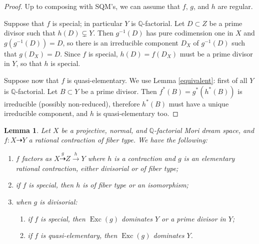 \documentclass[a4paper,12pt]{amsart}
\newtheorem{lemma}[thm]{Lemma}
\theoremstyle{definition}
\numberwithin{figure}{section}
\numberwithin{table}{section}
\newcommand{\Q}{\mathbb{Q}}
\newcommand{\Exc}{\operatorname{Exc}}
\begin{document}
\begin{proof}
Up to composing with SQM's, we can assume that $f$, $g$, and $h$ are regular.
  
Suppose that $f$ is special; in particular $Y$ is $\Q$-factorial. Let $D\subset Z$ be a prime divisor such that $h(D)\subsetneq Y$.
Then $g^{-1}(D)$ has pure codimension one in $X$ and $g(g^{-1}(D))=D$, so there is an irreducible component 
 $D_X$ of $g^{-1}(D)$ such that $g(D_X)=D$. Since $f$ is special, $h(D)=f(D_X)$ must be a prime divisor in $Y$, so that $h$ is special.

Suppose now that $f$ is quasi-elementary. We use Lemma \ref{equivalent}:
first of all $Y$ is $\Q$-factorial. Let $B\subset Y$ be a prime divisor. Then $f^*(B)=g^*(h^*(B))$ is irreducible (possibly non-reduced), therefore $h^*(B)$ must have a unique irreducible component, and $h$ is quasi-elementary too.
\end{proof}
\begin{lemma}\label{montenero}
  Let $X$ be a projective, normal, and $\Q$-factorial Mori dream space, and $f\colon X\dasharrow Y$ a  rational contraction of fiber type. We have the following:
  \begin{enumerate}[$(a)$]
    \item
  $f$ factors as $X \stackrel{g}{\dasharrow} Z\stackrel{h}{\to} Y$
  where $h$ is a contraction and $g$ is an elementary rational contraction, either divisorial or of fiber type;
\item if $f$ is special, then $h$ is of fiber type or an isomorphism;
\item  
 when $g$ is divisorial:  
\begin{enumerate}[$\bullet$]
  \item if $f$ is special, then $\Exc(g)$ dominates $Y$ or a prime divisor in $Y$;
\item
if $f$ is quasi-elementary, then $\Exc(g)$ dominates $Y$.
\end{enumerate}
\end{enumerate}
\end{lemma}
\end{document}
